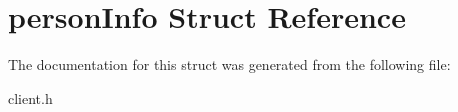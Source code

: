 \hypertarget{structperson_info}{\section{person\-Info Struct Reference}
\label{structperson_info}
}


The documentation for this struct was generated from the following file\-:\begin{DoxyCompactItemize}
\item 
client.\-h\end{DoxyCompactItemize}
